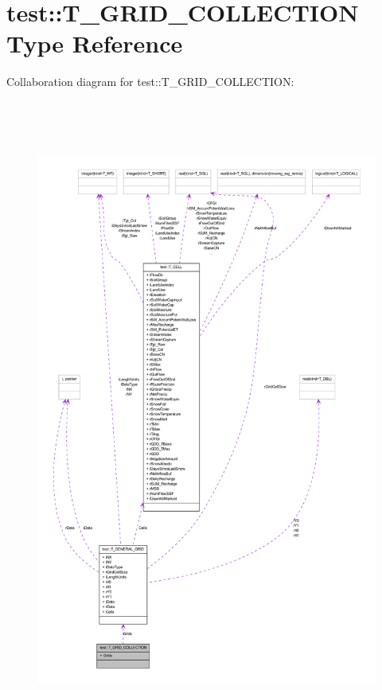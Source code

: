 \hypertarget{typetest_1_1_t___g_r_i_d___c_o_l_l_e_c_t_i_o_n}{
\section{test::T\_\-GRID\_\-COLLECTION Type Reference}
\label{typetest_1_1_t___g_r_i_d___c_o_l_l_e_c_t_i_o_n}
}


Collaboration diagram for test::T\_\-GRID\_\-COLLECTION:\nopagebreak
\begin{figure}[H]
\begin{center}
\leavevmode
\includegraphics[height=600pt]{typetest_1_1_t___g_r_i_d___c_o_l_l_e_c_t_i_o_n__coll__graph}
\end{center}
\end{figure}
